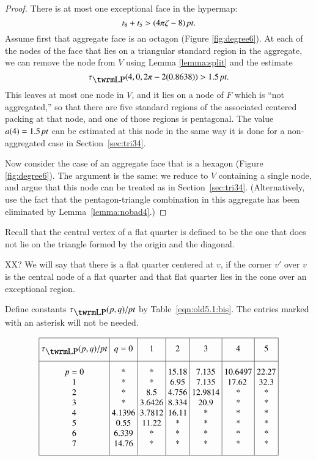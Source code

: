 \begin{proof}
There is at most one exceptional face in the hypermap:
    $$t_8 + t_5 > (4\pi\zeta-8)\,\hbox{\it pt}.$$
Assume first that aggregate face is an octagon (Figure
\ref{fig:degree6}). At each of the nodes of the face that lies on a
triangular standard region in the aggregate, we can remove the node
from $V$ using Lemma \ref {lemma:split} and the estimate
    $$\tauLP(4,0,2\pi-2 (0.8638)) > 1.5\,\pt.$$
This leaves at most one node in $V$, and it lies on a node of $F$
which is ``not aggregated,'' so that there are five standard
regions of the associated centered packing at that node, and one
of those regions is pentagonal.  The value $a(4)=1.5\,\hbox{\it pt}$ can be
estimated at this node in the same way it is done for a
non-aggregated case in Section~\ref{sec:tri34}.

Now consider the case of an aggregate face that is a hexagon (Figure
\ref{fig:degree6}).  The argument is the same: we reduce to $V$
containing a single node, and argue that this node can be treated as
in Section~\ref{sec:tri34}.  (Alternatively, use the fact that the
pentagon-triangle combination in this aggregate has been eliminated
by Lemma~\ref{lemma:nobad4}.)
\end{proof}



Recall that the central vertex of a flat quarter is defined to be
the one that does not lie on the triangle formed by the origin and
the diagonal.
%


XX?  We will say that there is a flat quarter centered at $v$, if
the corner $v'$ over $v$ is the central node of a flat quarter and
that flat quarter lies in the cone over an exceptional region.




Define constants $\tlp(p,q)/\pt$ by Table~\ref{eqn:old5.1:bis}. The
entries marked with an asterisk will not be needed.
%

\begin{equation}
\vbox{\offinterlineskip \hrule
\halign{&\vrule#&\strut\ \hfil#\hfil\ \cr   %
height 7pt&\omit&&\omit&&\omit&&\omit&&\omit&&\omit&&\omit&\cr
&\hfil $\tlp(p,q)/\pt$\hfil
        &&\hfil $q=0$\hfil
        &&\hfil1\hfil
        &&\hfil2\hfil
        &&\hfil3\hfil
        &&\hfil4\hfil
        &&\hfil5\hfil&
\cr height 7pt&\omit&&\omit&&\omit&&\omit&&\omit&&\omit&&\omit&\cr
\noalign{\hrule}
height7pt&\omit&&\omit&&\omit&&\omit&&\omit&&\omit&&\omit&\cr
&$p=0$&& *&& *&& 15.18&& 7.135&& 10.6497&& 22.27&\cr &1&&    *&& *&&
6.95&& 7.135&&17.62  && 32.3&\cr &2&&    *&&
8.5&&4.756&&12.9814&&*&&*&\cr &3&& *&& 3.6426&&8.334&&20.9&&*&&*&\cr
&4&&4.1396&&3.7812&&16.11&&*&&*&&*&\cr
&5&&0.55&&11.22&&*&&*&&*&&*&\cr &6&&6.339&&*&&*&&*&&*&&*&\cr
&7&&14.76&&*&&*&&*&&*&&*&\cr
height7pt&\omit&&\omit&&\omit&&\omit&&\omit&&\omit&&\omit&\cr}
\hrule }
    \label{eqn:old5.1:bis}
\end{equation}


